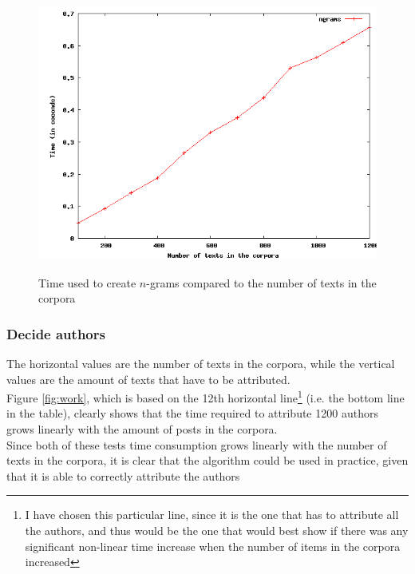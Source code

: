 \begin{figure}[!hbp]
\includegraphics[width=\textwidth]{tabeller/ngram.png}\\
\caption{Time used to create $n$-grams compared to the number of texts in the corpora\label{fig:ngram}}
\end{figure}

\subsubsection{Decide authors}
The horizontal values are the number of texts in the corpora, while the vertical values are the amount of texts that have to be attributed.\\


Figure \ref{fig:work}, which is based on the 12th horizontal line\footnote{I have chosen this particular line, since it is the one that has to attribute all the authors, and thus would be the one that would best show if there was any significant non-linear time increase when the number of items in the corpora increased} (i.e. the bottom line in the table), clearly shows that the time required to attribute 1200 authors grows linearly with the amount of posts in the corpora.\\

Since both of these tests time consumption grows linearly with the number of texts in the corpora, it is clear that the algorithm could be used in practice, given that it is able to correctly attribute the authors  

